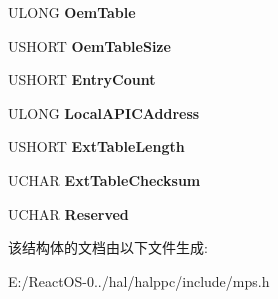 \begin{DoxyCompactItemize}
U\+L\+O\+NG {\bfseries Oem\+Table}
\item 
\mbox{\label{struct___m_p___c_o_n_f_i_g_u_r_a_t_i_o_n___t_a_b_l_e_a64114d48cb91d331cae560e17f34111c}} 
U\+S\+H\+O\+RT {\bfseries Oem\+Table\+Size}
\item 
\mbox{\label{struct___m_p___c_o_n_f_i_g_u_r_a_t_i_o_n___t_a_b_l_e_a365e211806d74aa62712f483379040e3}} 
U\+S\+H\+O\+RT {\bfseries Entry\+Count}
\item 
\mbox{\label{struct___m_p___c_o_n_f_i_g_u_r_a_t_i_o_n___t_a_b_l_e_ab1b4c4c898db154bfe83201f311d210a}} 
U\+L\+O\+NG {\bfseries Local\+A\+P\+I\+C\+Address}
\item 
\mbox{\label{struct___m_p___c_o_n_f_i_g_u_r_a_t_i_o_n___t_a_b_l_e_abb11ffda3a691f5d5bb6dd40349ae2d7}} 
U\+S\+H\+O\+RT {\bfseries Ext\+Table\+Length}
\item 
\mbox{\label{struct___m_p___c_o_n_f_i_g_u_r_a_t_i_o_n___t_a_b_l_e_a6b715386aff01029ddb2106aa40b0d07}} 
U\+C\+H\+AR {\bfseries Ext\+Table\+Checksum}
\item 
\mbox{\label{struct___m_p___c_o_n_f_i_g_u_r_a_t_i_o_n___t_a_b_l_e_a575b3b03d3aafa430dc9c89dbd9054c3}} 
U\+C\+H\+AR {\bfseries Reserved}
\end{DoxyCompactItemize}


该结构体的文档由以下文件生成\+:\begin{DoxyCompactItemize}
\item 
E\+:/\+React\+O\+S-\/0../hal/halppc/include/mps.\+h\end{DoxyCompactItemize}
